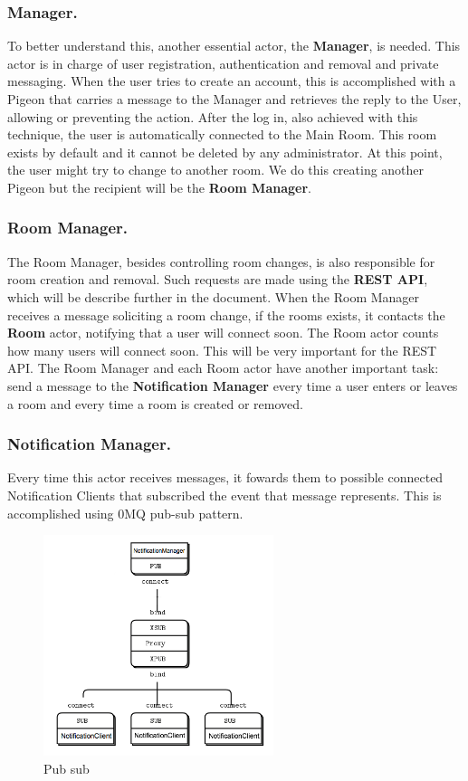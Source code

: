 \subsubsection{Manager.} To better understand this, another essential actor, the \textbf{Manager}, is needed. This actor is in charge of user registration, authentication and removal and private messaging. When the user tries to create an account, this is accomplished with a Pigeon that carries a message to the Manager and retrieves the reply to the User, allowing or preventing the action. After the log in, also achieved with this technique, the user is automatically connected to the Main Room. This room exists by default and it cannot be deleted by any administrator. At this point, the user might try to change to another room. We do this creating another Pigeon but the recipient will be the \textbf{Room Manager}.

\subsubsection{Room Manager.} The Room Manager, besides controlling room changes, is also responsible for room creation and removal. Such requests are made using the \textbf{REST API}, which will be describe further in the document. 
When the Room Manager receives a message soliciting a room change, if the rooms exists, it contacts the \textbf{Room} actor, notifying that a user will connect soon. The Room actor counts how many users will connect soon. This will be very important for the REST API. The Room Manager and each Room actor have another important task: send a message to the \textbf{Notification Manager} every time a user enters or leaves a room and every time a room is created or removed.

\subsubsection{Notification Manager.} Every time this actor receives messages, it fowards them to possible connected Notification Clients that subscribed the event that message represents. This is accomplished using 0MQ pub-sub pattern.

\begin{figure}[H]
\centering
\includegraphics[width=0.6\textwidth]{img/zeromq.png}
\caption{Pub sub}
\label{fig:zmq}
\end{figure}



